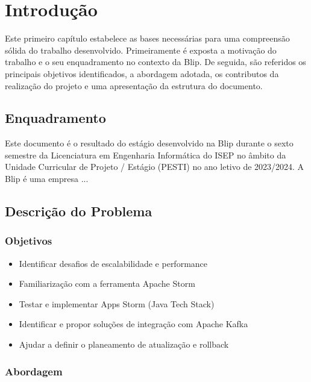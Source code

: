 \chapter{Introdução} 	
\label{sec:1-Introducao} %

Este primeiro capítulo estabelece as bases necessárias para uma compreensão sólida do trabalho desenvolvido.
Primeiramente é exposta a motivação do trabalho e o seu enquadramento no contexto da Blip. De seguida,
são referidos os principais objetivos identificados, a abordagem adotada, os contributos da realização 
do projeto e uma apresentação da estrutura do documento.

\section{Enquadramento}

Este documento é o resultado do estágio desenvolvido na Blip durante o sexto semestre da Licenciatura 
em Engenharia Informática do ISEP no âmbito da Unidade Curricular de Projeto / Estágio (PESTI) 
no ano letivo de 2023/2024. A Blip é uma empresa ...

\section{Descrição do Problema}



\subsection{Objetivos}
\label{sec:1-obj}

\begin{itemize}
  \item Identificar desafios de escalabilidade e performance
  \item Familiarização com a ferramenta Apache Storm 
  \item Testar e implementar Apps Storm (Java Tech Stack) 
  \item Identificar e propor soluções de integração com Apache Kafka 
  \item Ajudar a definir o planeamento de atualização e rollback 
\end{itemize}

\subsection{Abordagem}



